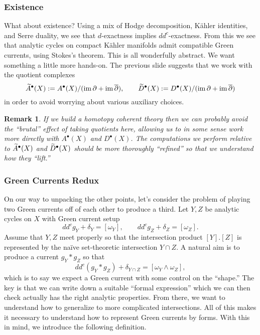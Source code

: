 \documentclass[11pt]{beamer}
\newtheorem{remark}{Remark}
\begin{document}
\begin{frame}
\frametitle{Existence}
What about existence? Using a mix of Hodge decomposition, K\"{a}hler identities, and Serre duality, we see that $d$-exactness implies $dd^c$-exactness. From this we see that analytic cycles on compact K\"{a}hler manifolds admit compatible Green currents, using Stokes's theorem. This is all wonderfully abstract. We want something a little more hands-on. The previous slide suggests that we work with the quotient complexes
$$\widetilde{A}^{\bullet}(X):=A^{\bullet}(X)/(\operatorname{im}\partial+\operatorname{im}\overline{\partial}),\qquad \widetilde{D}^{\bullet}(X):=D^{\bullet}(X)/(\operatorname{im}\partial+\operatorname{im}\overline{\partial})$$
in order to avoid worrying about various auxiliary choices. 

\begin{remark}
If we build a homotopy coherent theory then we can probably avoid the ``brutal'' effect of taking quotients here, allowing us to in some sense work more directly with $A^{\bullet}(X)$ and $D^{\bullet}(X)$. The computations we perform relative to $\widetilde{A}^{\bullet}(X)$ and $\widetilde{D}^{\bullet}(X)$ should be more thoroughly ``refined'' so that we understand how they ``lift.''
\end{remark}
\end{frame}

\begin{frame}
\frametitle{Green Currents Redux}
On our way to unpacking the other points, let's consider the problem of playing two Green currents off of each other to produce a third. Let $Y,Z$ be analytic cycles on $X$ with Green current setup
$$dd^cg_Y+\delta_Y=[\omega_Y],\qquad dd^cg_Z+\delta_Z=[\omega_Z].$$
Assume that $Y,Z$ meet properly so that the intersection product $[Y].[Z]$ is represented by the na\"{i}ve set-theoretic intersection $Y\cap Z$. A natural aim is to produce a current $g_Y*g_Z$ so that 
$$dd^c(g_Y*g_Z)+\delta_{Y\cap Z}=[\omega_Y\wedge\omega_Z],$$
which is to say we expect a Green current with some control on the ``shape.'' The key is that we can write down a suitable ``formal expression'' which we can then check actually has the right analytic properties. From there, we want to understand how to generalize to more complicated intersections. All of this makes it necessary to understand how to represent Green currents by forms. With this in mind, we introduce the following definition. 
\end{frame}
\end{document}
